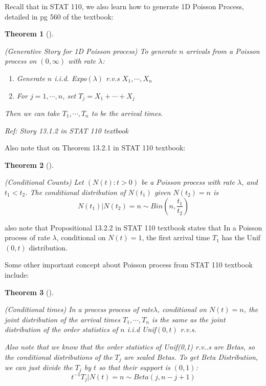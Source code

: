 \documentclass[
  letterpaper,
  DIV=11,
  numbers=noendperiod]{scrreprt}
\theoremstyle{plain}
\newtheorem{theorem}{Theorem}[chapter]
\theoremstyle{definition}
\theoremstyle{remark}
\begin{document}
Recall that in STAT 110, we also learn how to generate 1D Poisson
Process, detailed in pg 560 of the textbook:

\leavevmode{}%
\begin{theorem}[]\label{thm-poisson-story}

(Generative Story for 1D Poisson process) To generate \(n\) arrivals
from a Poisson process on \((0, \infty)\) with rate \(\lambda\):

\begin{enumerate}
\def\labelenumi{\arabic{enumi}.}
\item
  Generate \(n\) i.i.d. Expo\((\lambda)\) r.v.s \(X_1, \cdots, X_n\)
\item
  For \(j=1, \cdots, n\), set \(T_j = X_1 + \cdots+X_j\)
\end{enumerate}

Then we can take \(T_1, \cdots, T_n\) to be the arrival times.

\emph{Ref: Story 13.1.2 in STAT 110 textbook}

\end{theorem}

Also note that on Theorem 13.2.1 in STAT 110 textbook:

\leavevmode{}%
\begin{theorem}[]\label{thm-conditional-counts}

(Conditional Counts) Let \((N(t):t>0)\) be a Poisson process with rate
\(\lambda\), and \(t_1<t_2\). The conditional distribution of \(N(t_1)\)
given \(N(t_2) = n\) is
\[N(t_1)|N(t_2)=n \sim Bin \left(n, \frac{t_1}{t_2}\right)\]

\end{theorem}

also note that Propositional 13.2.2 in STAT 110 textbook states that In
a Poisson process of rate \(\lambda\), conditional on \(N(t) =1\), the
first arrival time \(T_1\) has the Unif\((0,t)\) distribution.

Some other important concept about Poisson process from STAT 110
textbook include:

\leavevmode{}%
\begin{theorem}[]\label{thm-conditional-time}

(Conditional times) In a process process of rate\(\lambda\), conditional
on \(N(t)=n\), the joint distribution of the arrival times
\(T_1, \cdots, T_n\) is the same as the joint distribution of the order
statistics of \(n\) i.i.d Unif\((0,t)\) r.v.s.

Also note that we know that the order statistics of Unif(0,1) r.v..s are
Betas, so the conditional distributions of the \(T_j\) are \emph{scaled}
Betas. To get Beta Distribution, we can just divide the \(T_j\) by \(t\)
so that their support is \((0,1)\):
\[t^{-1}T_j | N(t) = n \sim Beta(j, n-j+1)\]

\end{theorem}
\end{document}

